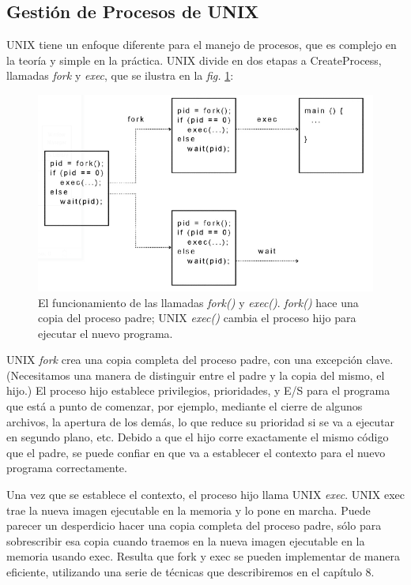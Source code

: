 \documentclass[10pt]{book}
\begin{document}
\subsection{Gestión de Procesos de UNIX}
UNIX tiene un enfoque diferente para el manejo de procesos, que es complejo en la teoría y simple en la práctica. UNIX divide en dos etapas a CreateProcess, llamadas \textit{fork} y \textit{exec}, que se ilustra en la \textit{fig.} \ref{fig0302}:
\begin{figure}[tbhp]
\centerline{\includegraphics[scale=0.45]{img/fig0302}}
\caption{El funcionamiento de las llamadas \textit{fork()} y \textit{exec()}. \textit{fork()} hace una copia del proceso padre; UNIX \textit{exec()} cambia el proceso hijo para ejecutar el nuevo programa.}
\label{fig0302}
\end{figure}

UNIX \textit{fork} crea una copia completa del proceso padre, con una excepción clave. (Necesitamos una manera de distinguir entre el padre y la copia del mismo, el hijo.) El proceso hijo establece privilegios, prioridades, y E/S para el programa que está a punto de comenzar, por ejemplo, mediante el cierre de algunos archivos, la apertura de los demás, lo que reduce su prioridad si se va a ejecutar en segundo plano, etc. Debido a que el hijo corre exactamente el mismo código que el padre, se puede confiar en que va a establecer el contexto para el nuevo programa correctamente.

Una vez que se establece el contexto, el proceso hijo llama UNIX \textit{exec}. UNIX exec trae la nueva imagen ejecutable en la memoria y lo pone en marcha. Puede parecer un desperdicio hacer una copia completa del proceso padre, sólo para sobrescribir esa copia cuando traemos en la nueva imagen ejecutable en la memoria usando exec. Resulta que fork y exec se pueden implementar de manera eficiente, utilizando una serie de técnicas que describiremos en el capítulo 8.
\end{document}
